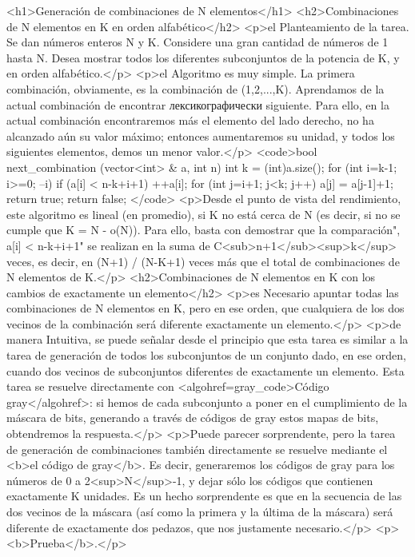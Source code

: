 <h1>Generación de combinaciones de N elementos</h1>
<h2>Combinaciones de N elementos en K en orden alfabético</h2>
<p>el Planteamiento de la tarea. Se dan números enteros N y K. Considere una gran cantidad de números de 1 hasta N. Desea mostrar todos los diferentes subconjuntos de la potencia de K, y en orden alfabético.</p>
<p>el Algoritmo es muy simple. La primera combinación, obviamente, es la combinación de (1,2,...,K). Aprendamos de la actual combinación de encontrar лексикографически siguiente. Para ello, en la actual combinación encontraremos más el elemento del lado derecho, no ha alcanzado aún su valor máximo; entonces aumentaremos su unidad, y todos los siguientes elementos, demos un menor valor.</p>
<code>bool next_combination (vector<int> & a, int n) {
int k = (int)a.size();
for (int i=k-1; i>=0; --i)
if (a[i] < n-k+i+1) {
++a[i];
for (int j=i+1; j<k; j++)
a[j] = a[j-1]+1;
return true;
}
return false;
}</code>
<p>Desde el punto de vista del rendimiento, este algoritmo es lineal (en promedio), si K no está cerca de N (es decir, si no se cumple que K = N - o(N)). Para ello, basta con demostrar que la comparación", a[i] < n-k+i+1" se realizan en la suma de C<sub>n+1</sub><sup>k</sup> veces, es decir, en (N+1) / (N-K+1) veces más que el total de combinaciones de N elementos de K.</p>
<h2>Combinaciones de N elementos en K con los cambios de exactamente un elemento</h2>
<p>es Necesario apuntar todas las combinaciones de N elementos en K, pero en ese orden, que cualquiera de los dos vecinos de la combinación será diferente exactamente un elemento.</p>
<p>de manera Intuitiva, se puede señalar desde el principio que esta tarea es similar a la tarea de generación de todos los subconjuntos de un conjunto dado, en ese orden, cuando dos vecinos de subconjuntos diferentes de exactamente un elemento. Esta tarea se resuelve directamente con <algohref=gray_code>Código gray</algohref>: si hemos de cada subconjunto a poner en el cumplimiento de la máscara de bits, generando a través de códigos de gray estos mapas de bits, obtendremos la respuesta.</p>
<p>Puede parecer sorprendente, pero la tarea de generación de combinaciones también directamente se resuelve mediante el <b>el código de gray</b>. Es decir, generaremos los códigos de gray para los números de 0 a 2<sup>N</sup>-1, y dejar sólo los códigos que contienen exactamente K unidades. Es un hecho sorprendente es que en la secuencia de las dos vecinos de la máscara (así como la primera y la última de la máscara) será diferente de exactamente dos pedazos, que nos justamente necesario.</p>
<p><b>Prueba</b>.</p>
